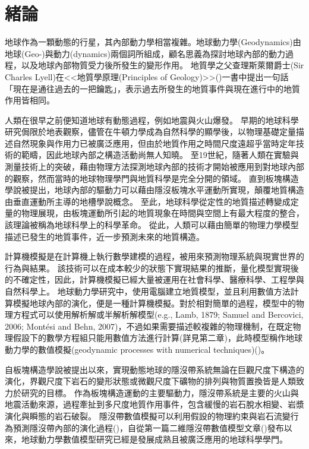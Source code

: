 
\chapter{緒論}

地球作為一顆動態的行星，其內部動力學相當複雜。地球動力學(Geodynamics)由地球(Geo-)與動力(dynamics)兩個詞所組成，顧名思義為探討地球內部的動力過程，以及地球內部物質受力後所發生的變形作用。
地質學之父查理斯萊爾爵士(Sir Charles Lyell)在<<地質學原理(Principles of Geology)>>(\citealp{lyell2009})一書中提出一句話「現在是通往過去的一把鑰匙」，表示過去所發生的地質事件與現在進行中的地質作用皆相同。

人類在很早之前便知道地球有動態過程，例如地震與火山爆發。
早期的地球科學研究侷限於地表觀察，儘管在牛頓力學成為自然科學的顯學後，以物理基礎定量描述自然現象與作用力已被廣泛應用，但由於地質作用之時間尺度遠超乎當時定年技術的範疇，因此地球內部之構造活動尚無人知曉。
至19世紀，隨著人類在實驗與測量技術上的突破，藉由物理方法探測地球內部的技術才開始被應用到對地球內部的觀察，然而當時的地球物理學門與地質科學是完全分開的領域。
直到板塊構造學說被提出，地球內部的驅動力可以藉由隱沒板塊水平運動所實現，顛覆地質構造由垂直運動所主導的地槽學說概念。
至此，地球科學從定性的地質描述轉變成定量的物理展現，由板塊運動所引起的地質現象在時間與空間上有最大程度的整合，該理論被稱為地球科學上的科學革命。
從此，人類可以藉由簡單的物理力學模型描述已發生的地質事件，近一步預測未來的地質構造。

計算機模擬是在計算機上執行數學建模的過程，被用來預測物理系統與現實世界的行為與結果。
該技術可以在成本較少的狀態下實現結果的推斷，量化模型實現後的不確定性，因此，計算機模擬已經大量被運用在社會科學、醫療科學、工程學與自然科學上。
地球動力學研究中，使用電腦建立地質模型，並且利用數值方法計算模擬地球內部的演化，便是一種計算機模擬。對於相對簡單的過程，模型中的物理方程式可以使用解析解或半解析解模型(e.g., Lamb, 1879; Samuel and Bercovici, 2006; Montési and Behn, 2007)，不過如果需要描述較複雜的物理機制，在既定物理假設下的數學方程組只能用數值方法進行計算(詳見第二章)，此時模型稱作地球動力學的數值模擬(geodynamic processes with numerical techniques)(\citealp{101Geodynamics})。

自板塊構造學說被提出以來，實現動態地球的隱沒帶系統無論在巨觀尺度下構造的演化，界觀尺度下岩石的變形狀態或微觀尺度下礦物的排列與物質置換皆是人類致力於研究的目標。
作為板塊構造運動的主要驅動力，隱沒帶系統是主要的火山與地震活動來源，過程牽扯到多尺度地質作用事件，包含緩慢的岩石脫水相變、岩漿演化與瞬態的岩石破裂。
隱沒帶數值模擬可以利用假設的物理約束與岩石流變行為預測隱沒帶內部的演化過程(\citealp{Gerya2011})，自從第一篇二維隱沒帶數值模型文章(\citealp{minear1970thermal})發布以來，地球動力學數值模型研究已經是發展成熟且被廣泛應用的地球科學學門。

